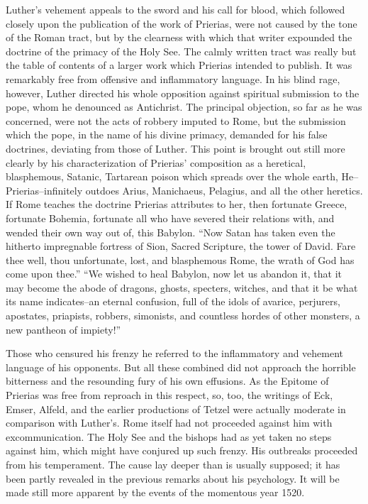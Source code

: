 Luther’s vehement appeals to the sword and his call for blood,
which followed closely upon the publication of the work of Prierias,
were not caused by the tone of the Roman tract, but by the clearness
with which that writer expounded the doctrine of the primacy of
the Holy See. The calmly written tract was really but the table of
contents of a larger work which Prierias intended to publish. It was
remarkably free from offensive and inflammatory language. In his
blind rage, however, Luther directed his whole opposition against
spiritual submission to the pope, whom he denounced as Antichrist. The
principal objection, so far as he was concerned, were not
the acts of robbery imputed to Rome, but the submission which
the pope, in the name of his divine primacy, demanded for his false
doctrines, deviating from those of Luther. This point is brought
out still more clearly by his characterization of Prierias’ composition
as a heretical, blasphemous, Satanic, Tartarean poison which
spreads over the whole earth, He--Prierias--infinitely outdoes
Arius, Manichaeus, Pelagius, and all the other heretics. If Rome teaches
the doctrine Prierias attributes to her, then fortunate Greece,
fortunate Bohemia, fortunate all who have severed their relations with,
and wended their own way out of, this Babylon. “Now Satan has
taken even the hitherto impregnable fortress of Sion, Sacred Scripture,
the tower of David. Fare thee well, thou unfortunate, lost, and
blasphemous Rome, the wrath of God has come upon thee.” “We
wished to heal Babylon, now let us abandon it, that it may become
the abode of dragons, ghosts, specters, witches, and that it be what
its name indicates--an eternal confusion, full of the idols of avarice,
perjurers, apostates, priapists, robbers, simonists, and countless hordes
of other monsters, a new pantheon of impiety!”

Those who censured his frenzy he referred to the inflammatory
and vehement language of his opponents. But all these combined did
not approach the horrible bitterness and the resounding fury of
his own effusions. As the Epitome of Prierias was free from reproach
in this respect, so, too, the writings of Eck, Emser, Alfeld, and the
earlier productions of Tetzel were actually moderate in comparison
with Luther’s. Rome itself had not proceeded against him with excommunication.
The Holy See and the bishops had as yet taken no
steps against him, which might have conjured up such frenzy. His
outbreaks proceeded from his temperament. The cause lay deeper
than is usually supposed; it has been partly revealed in the previous
remarks about his psychology. It will be made still more apparent
by the events of the momentous year 1520.

